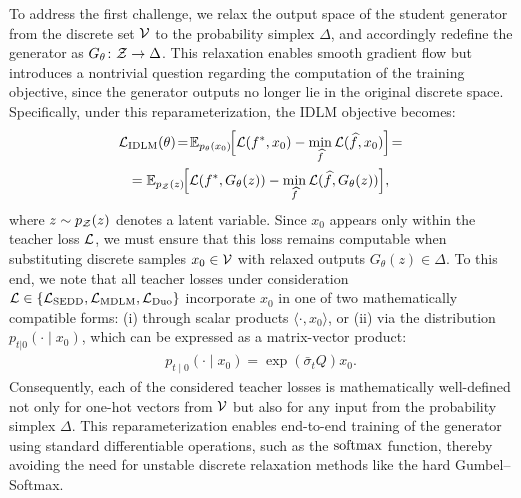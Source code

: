 \label{sec:simplex relaxation}
To address the first challenge, we relax the output space of the student generator from the discrete set $\mathcal{V}$ to the probability simplex $\Delta$, and accordingly redefine the generator as $G_{\theta}\colon \mathcal{Z} \to \Delta$. This relaxation enables smooth gradient flow but introduces a nontrivial question regarding the computation of the training objective, since the generator outputs no longer lie in the original discrete space. Specifically, under this reparameterization, the IDLM objective becomes:
\begin{gather}
  \mathcal{L}_{\text{IDLM}}(\theta)
  \!=\! \mathbb{E}_{p_{\theta}(x_0)}\!\Bigl[\mathcal{L}(f^*, x_0) - \min_{\widehat{f}}\mathcal{L}(\widehat{f}, x_0)\Bigr]\!=
  \nonumber \\
  = \mathbb{E}_{p_{\mathcal{Z}}(z)}\!\Bigl[\mathcal{L}(f^*, G_{\theta}(z)) - \min_{\widehat{f}}\mathcal{L}(\widehat{f}, G_{\theta}(z))\Bigr],
  \nonumber
\end{gather}
where $z \sim p_{\mathcal{Z}}(z)$ denotes a latent variable. Since $x_0$ appears only within the teacher loss $\mathcal{L}$, we must ensure that this loss remains computable when substituting discrete samples $x_0 \in \mathcal{V}$ with relaxed outputs $G_{\theta}(z) \in \Delta$. To this end, we note that all teacher losses under consideration $\mathcal{L} \in \{\mathcal{L}_{\text{SEDD}}, \mathcal{L}_{\text{MDLM}}, \mathcal{L}_{\text{Duo}}\}$ incorporate $x_0$ in one of two mathematically compatible forms: (i) through scalar products $\langle \cdot, x_0 \rangle$, or (ii) via the distribution $p_{t|0}(\cdot \mid x_0)$, which can be expressed as a matrix-vector product:
\begin{gather}
    p_{t \mid 0}(\cdot \mid x_0) = \exp\left(\bar{\sigma}_t Q\right)x_0.
    \nonumber
\end{gather}
%
Consequently, each of the considered teacher losses is mathematically well-defined not only for one-hot vectors from $\mathcal{V}$ but also for any input from the probability simplex $\Delta$. This reparameterization enables end-to-end training of the generator using standard differentiable operations, such as the $\mathrm{softmax}$ function, thereby avoiding the need for unstable discrete relaxation methods like the hard Gumbel--Softmax.
